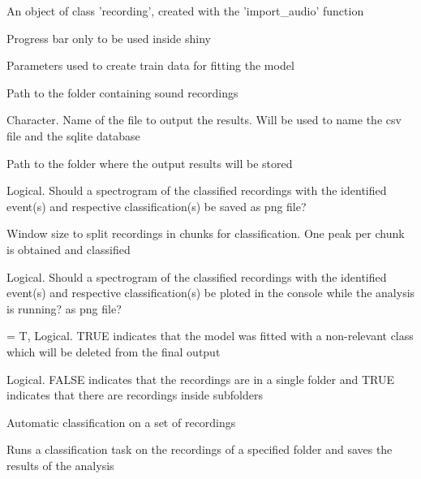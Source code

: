 \documentclass[letterpaper]{book}
\begin{document}
\begin{Arguments}
\begin{ldescription}
\item[\code{model\_path}] An object of class 'recording', created with
the 'import\_audio' function

\item[\code{updateProgress}] Progress bar only to be used inside shiny

\item[\code{metadata}] Parameters used to create train data for fitting the model

\item[\code{file\_path}] Path to the folder containing sound recordings

\item[\code{out\_file}] Character. Name of the file to output the results.
Will be used to name the csv file and the sqlite database

\item[\code{out\_dir}] Path to the folder where the output results will be stored

\item[\code{save\_png}] Logical. Should a spectrogram of the classified recordings
with the identified event(s) and respective classification(s) be saved
as png file?

\item[\code{win\_size}] Window size to split recordings in chunks for classification.
One peak per chunk is obtained and classified

\item[\code{plot2console}] Logical. Should a spectrogram of the classified
recordings with the identified event(s) and respective classification(s)
be ploted in the console while the analysis is running?
as png file?

\item[\code{remove\_noise}] = T, Logical. TRUE indicates that the model was fitted
with a non-relevant class which will be deleted from the final output

\item[\code{recursive}] Logical. FALSE indicates that the recordings are in
a single folder and TRUE indicates that there are recordings
inside subfolders
\end{ldescription}
\end{Arguments}
%
\begin{Details}\relax
Automatic classification on a set of recordings

Runs a classification task on the recordings of a specified folder
and saves the results of the analysis
\end{Details}
\end{document}
